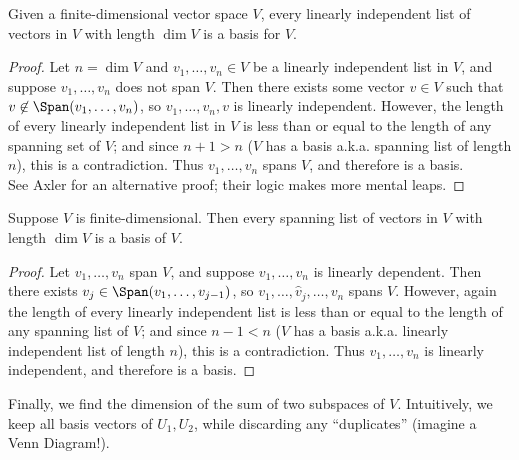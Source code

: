 \documentclass[math0540-lecture-notes.tex]{subfiles}
\begin{document}
\begin{proposition}{}
  Given a finite-dimensional vector space $V$, every linearly independent list of vectors in $V$ 
  with length $\dim V$ is a basis for $V$.
\end{proposition}
\begin{proof}[Proof]
  Let $n=\dim V$ and $v_1,\ldots,v_n\in V$ be a linearly independent list in $V$, and suppose
  $v_1,\ldots,v_n$ does not span $V$. Then there exists some vector $v\in V$ such that $v\not\in
  \Span(v_1,\ldots,v_n)$, so $v_1,\ldots,v_n,v$ is linearly independent. However, the length of 
  every linearly independent list in $V$ is less than or equal to the length of any spanning set of
  $V$; and since $n+1 > n$ ($V$ has a basis a.k.a. spanning list of length $n$), this is a
  contradiction. Thus $v_1,\ldots,v_n$ spans $V$, and therefore is a basis.\\

  See Axler for an alternative proof; their logic makes more mental leaps.
\end{proof}

\begin{proposition}{}
  Suppose $V$ is finite-dimensional. Then every spanning list of vectors in $V$ with length $\dim V$ 
  is a basis of $V$.
\end{proposition}
\begin{proof}[Proof]
  Let $ v_1,\ldots,v_n$ span $V$, and suppose $v_1,\ldots,v_n$ is linearly dependent. Then there
  exists $v_j\in \Span(v_1,\ldots,v_{j-1})$, so $v_1,\ldots,\hat{v}_j,\ldots,v_n$ spans $V$.
  However, again the length of every linearly independent list is less than or equal to the length
  of any spanning list of $V$; and since $n-1<n$ ($V$ has a basis a.k.a. linearly independent list
  of length $n$), this is a contradiction. Thus $ v_1,\ldots,v_n$ is linearly independent, and
  therefore is a basis.
\end{proof}

Finally, we find the dimension of the sum of two subspaces of $V$. Intuitively, we keep all basis
vectors of $U_1,U_2$, while discarding any ``duplicates'' (imagine a Venn Diagram!).
\end{document}
